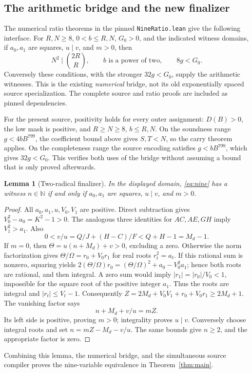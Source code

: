 \documentclass[11pt]{article}
\newtheorem{lemma}[theorem]{Lemma}
\newcommand{\N}{\mathbb N}
\begin{document}
\subsection{The arithmetic bridge and the new finalizer}
The numerical ratio theorems in the pinned \texttt{NineRatio.lean} give the
following interface. For $R,N\ge8$, $0<b\le R,N$, $G_0>0$, and the indicated
witness domains, if $a_0,a_1$ are squares, $u\mid v$, and $m>0$, then
\[
 N^2\mid\binom{2R}{R},\qquad b\text{ is a power of two},\qquad8g<G_0.
\]
Conversely these conditions, with the stronger $32g<G_0$, supply the
arithmetic witnesses. This is the existing \emph{numerical} bridge, not its
old exponentially spaced source specialization. The complete source and
ratio proofs are included as pinned dependencies.

For the present source, positivity holds for every outer assignment:
$D(B)>0$, the low mask is positive, and $R\ge N\ge8$, $b\le R,N$.
On the soundness range $g<4bB^{799}$, the coefficient bound above gives
$S,T<N$, so the carry theorem applies. On the completeness range the source
encoding satisfies $g<bB^{799}$, which gives $32g<G_0$. This verifies both
uses of the bridge without assuming a bound that is only proved afterwards.

\begin{lemma}[Two-radical finalizer]
In the displayed domain, \eqref{eq:nine} has a witness $n\in\N$ if and only
if $a_0,a_1$ are squares, $u\mid v$, and $m>0$.
\end{lemma}
\begin{proof}
All $a_0,a_1,u,V_0,V_1$ are positive. Direct subtraction gives
$V_0^2-a_0=K^2-1>0$. The analogous three identities for $AC,AE,GH$ imply
$V_1^2>a_1$. Also
\[
 0<v/u=Q/J+(H-C)/F<Q+H-1=M_d-1.
\]
If $m=0$, then $\Theta=u(n+M_d)+v>0$, excluding a zero. Otherwise the norm
factorization gives $\Theta/\Omega=r_0+V_0r_1$ for real roots $r_t^2=a_t$.
If this rational sum is nonzero, squaring yields
$2(\Theta/\Omega)r_0=(\Theta/\Omega)^2+a_0-V_0^2a_1$; hence both roots are
rational, and then integral. A zero sum would imply
$|r_1|=|r_0|/V_0<1$, impossible for the square root of the positive integer
$a_1$. Thus the roots are integral and $|r_t|\le V_t-1$.
Consequently $Z=2M_d+V_0V_1+r_0+V_0r_1\ge2M_d+1$. The vanishing factor says
\[
 n+M_d+v/u=mZ.
\]
Its left side is positive, proving $m>0$; integrality proves $u\mid v$.
Conversely choose integral roots and set $n=mZ-M_d-v/u$. The same bounds give
$n\ge2$, and the appropriate factor is zero.
\end{proof}
Combining this lemma, the numerical bridge, and the simultaneous source
compiler proves the nine-variable equivalence in Theorem~\ref{thm:main}.
\end{document}
